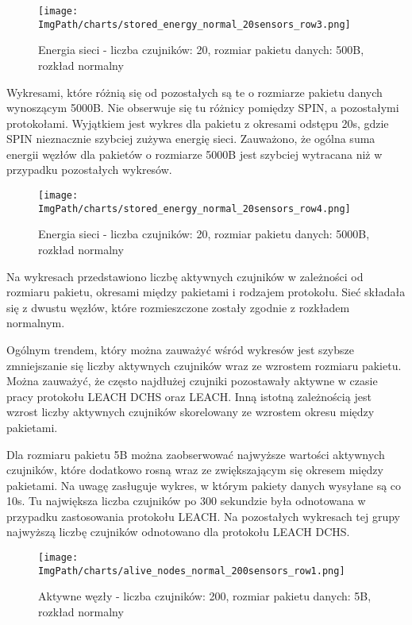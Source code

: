 \begin{figure}[H]
	\begin{center}
		\texttt{[image: \\ImgPath/charts/stored\_energy\_normal\_20sensors\_row3.png]}
	\end{center}
	\caption{Energia sieci - liczba czujników: 20, rozmiar pakietu danych: 500B, rozkład normalny}
\end{figure}

Wykresami, które różnią się od pozostałych są te o rozmiarze pakietu danych wynoszącym 5000B. Nie obserwuje się tu różnicy pomiędzy SPIN, a pozostałymi protokołami. Wyjątkiem jest wykres dla pakietu z okresami odstępu 20s, gdzie SPIN nieznacznie szybciej zużywa energię sieci. Zauważono, że ogólna suma energii węzłów dla pakietów o rozmiarze 5000B jest szybciej wytracana niż w przypadku pozostałych wykresów.

\begin{figure}[H]
	\begin{center}
		\texttt{[image: \\ImgPath/charts/stored\_energy\_normal\_20sensors\_row4.png]}
	\end{center}
	\caption{Energia sieci - liczba czujników: 20, rozmiar pakietu danych: 5000B, rozkład normalny}
\end{figure}

Na wykresach przedstawiono liczbę aktywnych czujników w zależności od rozmiaru pakietu, okresami między pakietami i rodzajem protokołu. Sieć składała się z dwustu węzłów, które rozmieszczone zostały zgodnie z rozkładem normalnym.

Ogólnym trendem, który można zauważyć wśród wykresów jest szybsze zmniejszanie się liczby aktywnych czujników wraz ze wzrostem rozmiaru pakietu. Można zauważyć, że często najdłużej czujniki pozostawały aktywne w czasie pracy protokołu LEACH DCHS oraz LEACH. Inną istotną zależnością jest wzrost liczby aktywnych czujników skorelowany ze wzrostem okresu między pakietami.
 
Dla rozmiaru pakietu 5B można zaobserwować najwyższe wartości aktywnych czujników, które dodatkowo rosną wraz ze zwiększającym się okresem między pakietami. Na uwagę zasługuje wykres, w którym pakiety danych wysyłane są co 10s. Tu największa liczba czujników po 300 sekundzie była odnotowana w przypadku zastosowania protokołu LEACH. Na pozostałych wykresach tej grupy najwyższą liczbę czujników odnotowano dla protokołu LEACH DCHS.

\begin{figure}[H]
	\begin{center}
		\texttt{[image: \\ImgPath/charts/alive\_nodes\_normal\_200sensors\_row1.png]}
	\end{center}
	\caption{Aktywne węzły - liczba czujników: 200, rozmiar pakietu danych: 5B, rozkład normalny}
\end{figure}


